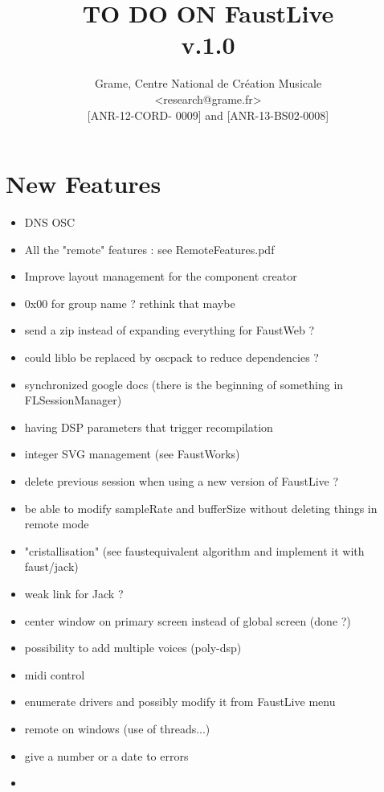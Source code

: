 \documentclass[a4paper]{article}
\begin{document}
\title{TO DO ON FaustLive \\ v.1.0}

\author{Grame, Centre National de Création Musicale\\
{\small <research@grame.fr>} \\
\vspace{2mm}
[ANR-12-CORD- 0009] and [ANR-13-BS02-0008]
}

\maketitle


\newpage
\section{New Features}

\begin{itemize}
\item DNS OSC 
\item All the "remote" features : see RemoteFeatures.pdf
\item Improve layout management for the component creator
\item 0x00 for group name ? rethink that maybe
\item send a zip instead of expanding everything for FaustWeb ?
\item could liblo be replaced by oscpack to reduce dependencies ?
\item synchronized google docs (there is the beginning of something in FLSessionManager)
\item having DSP parameters that trigger recompilation
\item integer SVG management (see FaustWorks)
\item delete previous session when using a new version of FaustLive ?
\item be able to modify sampleRate and bufferSize without deleting things in remote mode
\item "cristallisation" (see faustequivalent algorithm and implement it with faust/jack)
\item weak link for Jack ?
\item center window on primary screen instead of global screen (done ?)
\item possibility to add multiple voices (poly-dsp)
\item midi control 
\item enumerate drivers and possibly modify it from FaustLive menu
\item remote on windows (use of threads...)
\item give a number or a date to errors
\item 
\end{itemize}
\end{document}
